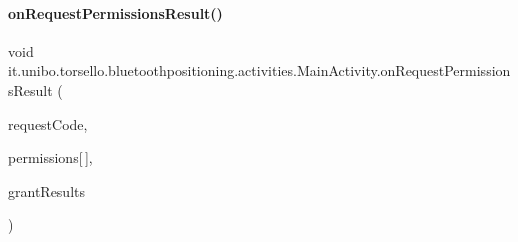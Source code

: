 \hypertarget{classit_1_1unibo_1_1torsello_1_1bluetoothpositioning_1_1activities_1_1MainActivity_a81d7581dfa4998b2ad8139f103328cf9_a81d7581dfa4998b2ad8139f103328cf9}{}\label{classit_1_1unibo_1_1torsello_1_1bluetoothpositioning_1_1activities_1_1MainActivity_a81d7581dfa4998b2ad8139f103328cf9_a81d7581dfa4998b2ad8139f103328cf9} 
\paragraph{\texorpdfstring{on\+Request\+Permissions\+Result()}{onRequestPermissionsResult()}}
{\footnotesize\ttfamily void it.\+unibo.\+torsello.\+bluetoothpositioning.\+activities.\+Main\+Activity.\+on\+Request\+Permissions\+Result (\begin{DoxyParamCaption}\item[{int}]{request\+Code,  }\item[{@Non\+Null String}]{permissions\mbox{[}$\,$\mbox{]},  }\item[{@Non\+Null int \mbox{[}$\,$\mbox{]}}]{grant\+Results }\end{DoxyParamCaption})}


